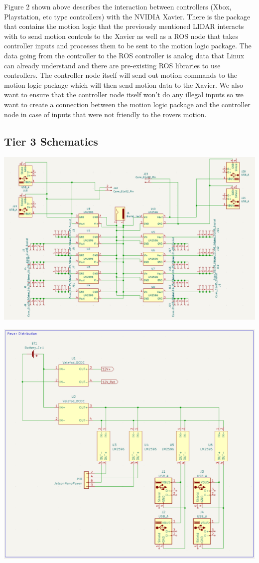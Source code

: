 \documentclass[a4paper, 10pt]{article}
\begin{document}
Figure 2 shown above describes the interaction between controllers (Xbox, Playstation, etc type controllers) with the NVIDIA Xavier. There is the package that contains the motion logic that the previously mentioned LIDAR interacts with to send motion controls to the Xavier as well as a ROS node that takes controller inputs and processes them to be sent to the motion logic package. The data going from the controller to the ROS controller is analog data that Linux can already understand and there are pre-existing ROS libraries to use controllers. The controller node itself will send out motion commands to the motion logic package which will then send motion data to the Xavier. We also want to ensure that the controller node itself won't do any illegal inputs so we want to create a connection between the motion logic package and the controller node in case of inputs that were not friendly to the rovers motion.	
	
	\subsection{Tier 3 Schematics}

\includegraphics[scale=0.7]{Puzzle Panel schematic 1}	
	
	
\includegraphics[scale=1.05]{Rover schematic 1}
\end{document}
